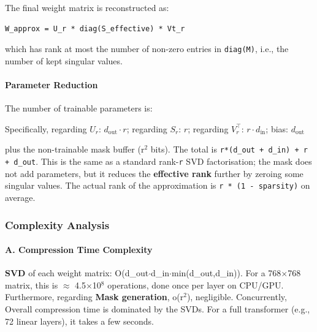 The final weight matrix is reconstructed as:

\vspace{0.5em}
\begin{mdframed}[backgroundcolor=codebg, linecolor=codeframe, linewidth=1pt, roundcorner=4pt, innerleftmargin=2pt, innerrightmargin=5pt, innertopmargin=5pt, innerbottommargin=5pt]
\begin{lstlisting}
W_approx = U_r * diag(S_effective) * Vt_r
\end{lstlisting}
\end{mdframed}
\vspace{0.5em}

which has rank at most the number of non-zero entries in \texttt{diag(M)}, i.e., the number of kept singular values.

\paragraph{Parameter Reduction}

The number of trainable parameters is:

Specifically, regarding $U_r$: $d_{\text{out}} \cdot r$; regarding $S_r$: $r$; regarding $V_r^\top$: $r \cdot d_{\text{in}}$; bias: $d_{\text{out}}$


plus the non-trainable mask buffer (r$^2$ bits). The total is \texttt{r*(d\_out + d\_in) + r + d\_out}. This is the same as a standard rank-\texttt{r} SVD factorisation; the mask does not add parameters, but it reduces the \textbf{effective rank} further by zeroing some singular values. The actual rank of the approximation is \texttt{r * (1 - sparsity)} on average.


\subsubsection*{Complexity Analysis}

\paragraph{A. Compression Time Complexity}

\textbf{SVD} of each weight matrix: O(d\_out$\cdot$d\_in$\cdot$min(d\_out,d\_in)). For a 768$\times$768 matrix, this is $\approx$ 4.5$\times$10$^8$ operations, done once per layer on CPU/GPU. Furthermore, regarding \textbf{Mask generation}, o(r$^2$), negligible. Concurrently, Overall compression time is dominated by the SVDs. For a full transformer (e.g., 72 linear layers), it takes a few seconds.


